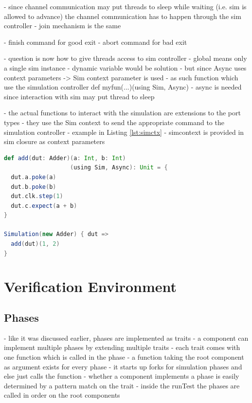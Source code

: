 \documentclass[11pt,a4paper]{report}
\begin{document}
- since channel communication may put threads to sleep while waiting (i.e. sim is allowed to advance) the channel communication has to happen through the sim controller
- join mechanism is the same

- finish command for good exit
- abort command for bad exit

- question is now how to give threads access to sim controller
- global means only a single sim instance
- dynamic variable would be solution
- but since Async uses context parameters -> Sim context parameter is used
- as such function which use the simulation controller def myfun(...)(using Sim, Async) 
- async is needed since interaction with sim may put thread to sleep

- the actual functions to interact with the simulation are extensions to the port types
- they use the Sim context to send the appropriate command to the simulation controller
- example in Listing \ref{lst:simctx}
- simcontext is provided in sim closure as context parameters

\begin{listing}
\begin{lstlisting}[language=scala, captionpos=b, caption=Example code for a function using the simulation context to interact with a DUT.,label=lst:simctx]
def add(dut: Adder)(a: Int, b: Int)
                   (using Sim, Async): Unit = {
  dut.a.poke(a)
  dut.b.poke(b)
  dut.clk.step(1)
  dut.c.expect(a + b)
}

Simulation(new Adder) { dut =>
  add(dut)(1, 2)
}
\end{lstlisting}
\end{listing}

\section{Verification Environment} %

\subsection{Phases} %

- like it was discussed earlier, phases are implemented as traits
- a component can implement multiple phases by extending multiple traits
- each trait comes with one function which is called in the phase
- a function taking the root component as argument exists for every phase
- it starts up forks for simulation phases and else just calls the function
- whether a component implements a phase is easily determined by a pattern match on the trait
- inside the runTest the phases are called in order on the root components
\end{document}
